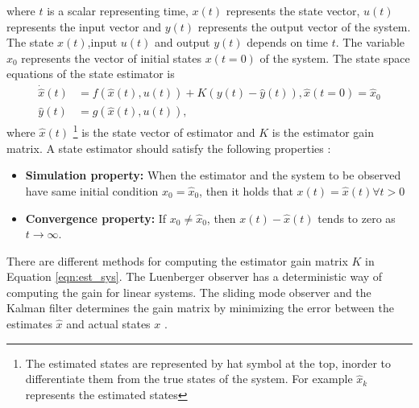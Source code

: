 where $t$ is a scalar representing time, $x(t)$ represents the state vector, $u(t)$ represents the input vector and $y(t)$ represents the output vector of the system. The state $x(t)$,input $u(t)$ and output $y(t)$ depends on time $t$. The variable $x_0$ represents the vector of initial states $x(t=0)$ of the system. 
The state space equations of the state estimator is 
\begin{equation}
\begin{split}
\label{eqn:est_sys}
\dot{\hat{x}}(t) &= f(\hat{x}(t),u(t)) + K(y(t)-\hat{y}(t)) , \hat{x}(t=0) = \hat{x}_0  \\
\hat{y}(t) &= g(\hat{x}(t),u(t)),
\end{split}
\end{equation}
where $\hat{x}(t)$ \footnote{ The estimated states are represented by hat symbol at the top, inorder to differentiate them from the true states of the system. For example $\hat x_k$ represents the estimated states} is the state vector of estimator and $K$ is the estimator gain matrix.  A state estimator should satisfy the following properties \citep{gre01}:
\begin{itemize}
\item \textbf{Simulation property:} When the estimator and the system to be observed have same initial condition $x_0 = \hat{x}_0$, then it holds that $x(t) = \hat{x}(t) \forall t > 0 $
\item \textbf{Convergence property:} If $x_0 \neq \hat{x}_0$, then $x(t) - \hat{x}(t)$ tends to zero as $ t \rightarrow \infty $.
\end{itemize}

There are different methods for computing the estimator gain matrix $K$ in Equation \ref{eqn:est_sys}. The Luenberger observer has a deterministic way of computing the gain for linear systems. The sliding mode observer and the Kalman filter determines the gain matrix by minimizing the error between the estimates $\hat{x}$ and actual states $x$ \citep{kha02}.